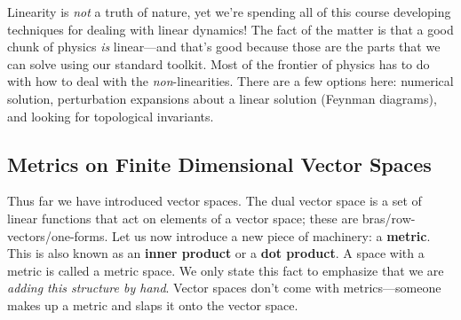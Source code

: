 Linearity is \emph{not} a truth of nature, yet we're spending all of this course developing techniques for dealing with linear dynamics! The fact of the matter is that a good chunk of physics \emph{is} linear---and that's good because those are the parts that we can solve using our standard toolkit. Most of the frontier of physics has to do with how to deal with the \emph{non}-linearities. There are a few options here: numerical solution, perturbation expansions about a linear solution (Feynman diagrams), and looking for topological invariants. 





\subsection{Metrics on Finite Dimensional Vector Spaces}

Thus far we have introduced vector spaces. The dual vector space is a set of linear functions that act on elements of a vector space; these are bras/row-vectors/one-forms. Let us now introduce a new piece of machinery: a \textbf{metric}. This is also known as an \textbf{inner product} or a \textbf{dot product}. A space with a metric is called a metric space. We only state this fact to emphasize that we are \emph{adding this structure by hand}. Vector spaces don't come with metrics---someone makes up a metric and slaps it onto the vector space.

